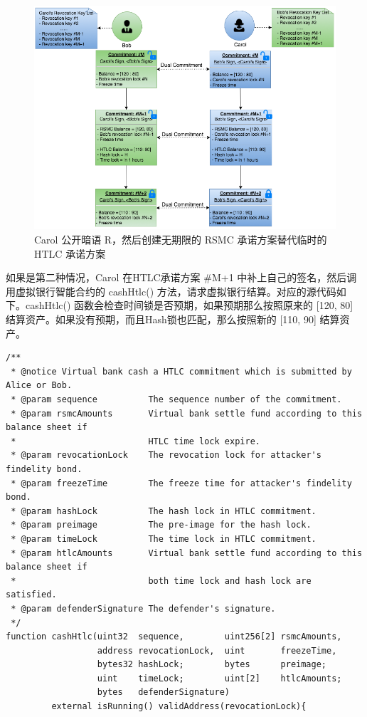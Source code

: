\begin{appendices}
\begin{figure}[h!]
    \centering
    \includegraphics[width=12cm, keepaspectratio]{../images/bob_carol_3.png}
    \caption{Carol 公开暗语 R，然后创建无期限的 RSMC 承诺方案替代临时的 HTLC 承诺方案}
    \label{fig:bob_carol_3}
\end{figure}

如果是第二种情况，Carol 在HTLC承诺方案 \#M+1 中补上自己的签名，然后调用虚拟银行智能合约的 cashHtlc() 方法，请求虚拟银行结算。对应的源代码如下。cashHtlc() 函数会检查时间锁是否预期，如果预期那么按照原来的 [120, 80] 结算资产。如果没有预期，而且Hash锁也匹配，那么按照新的 [110, 90] 结算资产。

\begin{lstlisting}[caption={兑现HTLC共同承诺}, label={lst:cashHtlc}]
/**
 * @notice Virtual bank cash a HTLC commitment which is submitted by Alice or Bob.
 * @param sequence          The sequence number of the commitment.
 * @param rsmcAmounts       Virtual bank settle fund according to this balance sheet if 
 *                          HTLC time lock expire.
 * @param revocationLock    The revocation lock for attacker's findelity bond.
 * @param freezeTime        The freeze time for attacker's findelity bond.
 * @param hashLock          The hash lock in HTLC commitment.
 * @param preimage          The pre-image for the hash lock.
 * @param timeLock          The time lock in HTLC commitment.
 * @param htlcAmounts       Virtual bank settle fund according to this balance sheet if 
 *                          both time lock and hash lock are satisfied.
 * @param defenderSignature The defender's signature.
 */
function cashHtlc(uint32  sequence,        uint256[2] rsmcAmounts, 
                  address revocationLock,  uint       freezeTime, 
                  bytes32 hashLock;        bytes      preimage;
                  uint    timeLock;        uint[2]    htlcAmounts;
                  bytes   defenderSignature) 
         external isRunning() validAddress(revocationLock){


\end{lstlisting}
\end{appendices}
